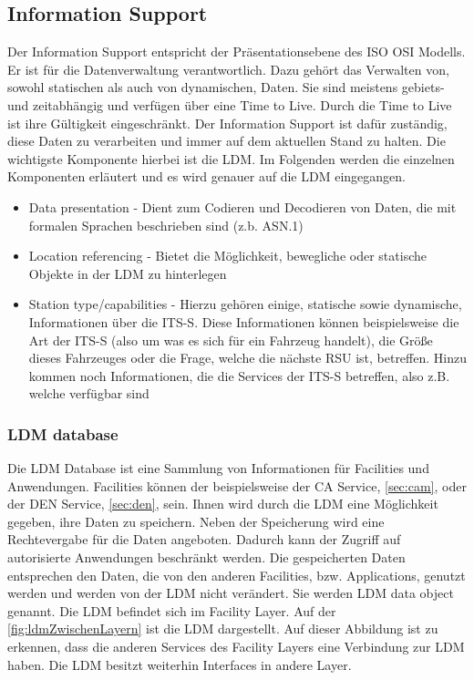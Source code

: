 \subsection{Information Support}
Der Information Support entspricht der Präsentationsebene des \ac{ISO} \ac{OSI} Modells. Er ist für die Datenverwaltung verantwortlich. Dazu gehört das Verwalten von, sowohl statischen als auch von dynamischen, Daten. Sie sind meistens gebiets- und zeitabhängig und verfügen über eine Time to Live. Durch die Time to Live ist ihre Gültigkeit eingeschränkt. Der Information Support ist dafür zuständig, diese Daten zu verarbeiten und immer auf dem aktuellen Stand zu halten. Die wichtigste Komponente hierbei ist die \ac{LDM}. Im Folgenden werden die einzelnen Komponenten erläutert und es wird genauer auf die LDM eingegangen.
\begin{itemize}
	\item Data presentation - Dient zum Codieren und Decodieren von Daten, die mit formalen Sprachen beschrieben sind (z.b. \ac{ASN.1})
	\item Location referencing - Bietet die Möglichkeit, bewegliche oder statische Objekte in der LDM zu hinterlegen 
	\item Station type/capabilities - Hierzu gehören einige, statische sowie dynamische, Informationen über die \ac{ITS-S}. Diese Informationen können beispielsweise die Art der \ac{ITS-S} (also um was es sich für ein Fahrzeug handelt), die Größe dieses Fahrzeuges oder die Frage, welche die nächste RSU ist, betreffen. Hinzu kommen noch Informationen, die die Services der \ac{ITS-S} betreffen, also z.B. welche verfügbar sind
\end{itemize}

\subsubsection{LDM database \label{facilitylayer_ldmdatabase}}
Die \ac{LDM} Database ist eine Sammlung von Informationen für Facilities und Anwendungen. Facilities können der beispielsweise der \ac{CA} Service, \autoref{sec:cam}, oder der \ac{DEN} Service, \autoref{sec:den}, sein. Ihnen wird durch die \ac{LDM} eine Möglichkeit gegeben, ihre Daten zu speichern. Neben der Speicherung wird eine Rechtevergabe für die Daten angeboten. Dadurch kann der Zugriff auf autorisierte Anwendungen beschränkt werden. Die gespeicherten Daten entsprechen den Daten, die von den anderen Facilities, bzw. Applications, genutzt werden und  werden von der  \ac{LDM} nicht verändert. Sie werden \ac{LDM} data object genannt. 
Die \ac{LDM} befindet sich im Facility Layer. Auf der \autoref{fig:ldmZwischenLayern} ist die \ac{LDM} dargestellt. Auf dieser Abbildung ist zu erkennen, dass die anderen Services des Facility Layers eine Verbindung zur \ac{LDM} haben. Die \ac{LDM} besitzt weiterhin Interfaces in andere Layer.

